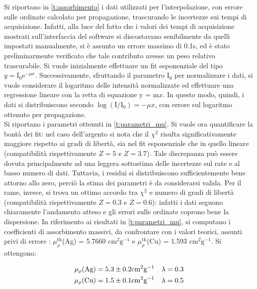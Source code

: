 \documentclass[twocolumn,10pt]{asme2ej}
\begin{document}
Si riportano in \autoref{t:assorbimento} i dati utilizzati per l'interpolazione, con errore sulle ordinate calcolato per 
propagazione, trascurando le incertezze sui tempi di acquisizione. Infatti, alla luce del fatto che i valori dei tempi di
acquisizione mostrati sull'interfaccia del software si discostavano senibilmente da quelli impostati manualmente, si è 
assunto un errore massimo di 0.1\si{\second}, ed è stato preliminarmente verificato che tale contributo avesse un peso 
relativo trascurabile. Si vuole inizialmente effettuare un fit esponenziale del tipo $y = \text{I}_0 \text{e}^{-\mu x }$. 
Successivamente, sfruttando il parametro $\text{I}_0 $ per normalizzare i dati, si vuole considerare il logaritmo delle 
intensità normalizzate ed effettuare una regressione lineare con la retta  di equazione y = m$x$.  In questo modo, quindi, 
i dati si distribuiscono secondo $\log(\text{I}/\text{I}_0)=-\mu x$, con errore sul logaritmo ottenuto per propagazione. \\
Si riportano i parametri ottenuti in \autoref{t:parametri_mu}. Si vuole ora quantificare la bontà dei fit: nel caso dell'argento si nota che 
il $\chi^2$ risulta significativamente maggiore rispetto ai gradi di libertà, sia nel fit esponenziale che in quello lineare
(compatibilità rispettivamente $Z=5$ e $Z=3.7$). Tale discrepanza può essere dovuta principalmente ad una leggera 
sottostima delle incertezze sul rate e al basso numero di dati. Tuttavia, i residui si distribuiscono sufficientemente bene
attorno allo zero, perciò la stima dei parametri è da considerarsi valida. Per il rame, invece, si trova un ottimo accordo tra
$\chi^2$ e numero di gradi di libertà (compatibilità rispettivamente $Z=0.3$ e $Z=0.6$): infatti i dati seguono chiaramente
l'andamento atteso e gli errori sulle ordinate coprono bene la dispersione. 
\indent In riferimento ai risultati in \autoref{t:parametri_mu}, si computano i coefficienti di assorbimento massivi, da confrontare con i valori 
teorici, assunti privi di errore : $\mu_{\rho}^{\text{th}}$(Ag) = 5.7660 $\si{\centi\metre^2\gram^{-1}}$ e
 $\mu_{\rho}^{\text{th}}$(Cu) = 1.593 $\si{\centi\metre^2\gram^{-1}}$. Si ottengono:

 \vspace{-15pt}
\begin{align*}
    \mu_{\rho}(\text{Ag}) &= 5.3\pm 0.2 \si{\centi\metre^2\gram^{-1}} & \lambda &= 0.3 \\
    \mu_{\rho}(\text{Cu}) &= 1.5\pm 0.1 \si{\centi\metre^2\gram^{-1}} & \lambda &= 0.5 
    \vspace{-5pt}
\end{align*}
\end{document}
